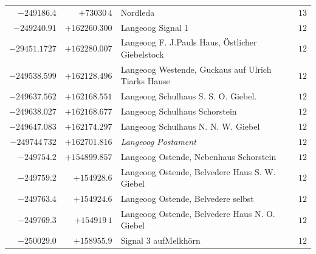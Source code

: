 \begin{center}
\begin{tabular}{r|r|p{170pt}|r}
\(-249186.4\)&\(+73030\,4\)&Nordleda&\(13\)\\
\(-249240.91\)&\(+162260.300\)&Langeoog Signal 1&\(12\)\\
\(-29451.1727\)&\(+162280.007\)&Langeoog F. J.Pauls Haus, Östlicher Giebelstock&\(12\)\\
\(-249538.599\)&\(+162128.496\)&Langeoog Westende, Guckaus auf Ulrich Tiarks Hause&\(12\)\\
\(-249637.562\)&\(+162168.551\)&Langeoog Schulhaus S. S. O. Giebel.&\(12\)\\
\(-249638.027\)&\(+162168.677\)&Langeoog Schulhaus Schorstein&\(12\)\\
\(-249647.083\)&\(+162174.297\)&Langeoog Schulhaus N. N. W. Giebel&\(12\)\\
\(-249744\,732\)&\(+162701.816\)&\textit{Langeoog Postament}&\(12\)\\
\(-249754.2\)&\(+154899.857\)&Langeoog Ostende, Nebenhaus Schorstein&\(12\)\\
\(-249759.2\)&\(+154928.6\)&Langeoog Ostende, Belvedere Haus S. W. Giebel&\(12\)\\
\(-249763.4\)&\(+154924.6\)&Langeoog Ostende, Belvedere selbst&\(12\)\\
\(-249769.3\)&\(+154919\,1\)&Langeoog Ostende, Belvedere Haus N. O. Giebel&\(12\)\\
\(-250029.0\)&\(+158955.9\)&Signal 3 aufMelkhörn&\(12\)\\
\hline\end{tabular}\endgroup\end{center}
\clearpage
